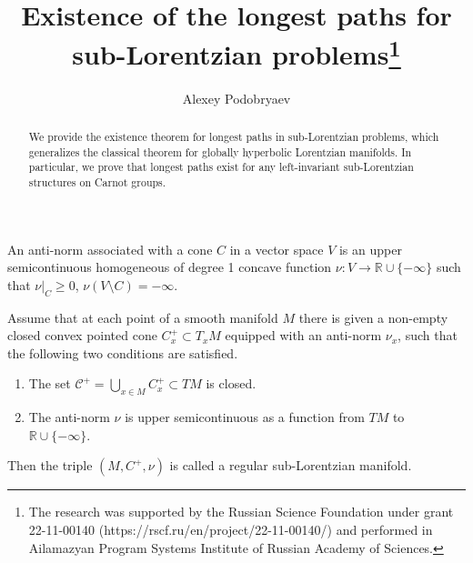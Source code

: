 \documentclass[12pt]{llncs}
\begin{document}
\fi

\title{Existence of the longest paths for sub-Lorentzian problems\thanks{The research was supported by the Russian Science Foundation under grant 22-11-00140 (https://rscf.ru/en/project/22-11-00140/) and performed in Ailamazyan Program Systems Institute of Russian Academy of Sciences.}}

\author{Alexey Podobryaev
}

\maketitle

\begin{abstract}
We provide the existence theorem for longest paths in sub-Lorentzian problems, which generalizes the classical theorem for globally hyperbolic Lorentzian manifolds. In particular, we prove that longest paths exist for any left-invariant sub-Lorentzian structures on Carnot groups.

\end{abstract}

\begin{definition}
\label{def-antinorm}
An anti-norm associated with a cone $C$ in a vector space $V$ is an upper semicontinuous homogeneous of degree 1 concave function
$\nu : V \rightarrow \mathbb{R} \cup \{-\infty\}$ such that
$\nu|_{C} \ge 0$, $\nu(V \setminus C) = -\infty$.
\end{definition}

\begin{definition}
\label{def-reg-sl}
Assume that at each point of a smooth manifold $M$ there is given a non-empty closed convex pointed cone $C^+_x \subset T_xM$ equipped with an anti-norm $\nu_x$, such that
the following two conditions are satisfied.
\begin{enumerate}
	\item[\emph{(1)}] The set $\mathcal{C}^+=\bigcup\limits_{x\in M}C^+_x\subset TM$ is closed.
    \item[\emph{(2)}] The anti-norm $\nu$ is upper semicontinuous as a function from $TM$ to $\mathbb{R}\cup\{-\infty\}$.
\end{enumerate}
Then the triple $(M, C^+, \nu)$ is called a regular sub-Lorentzian manifold.
\end{definition}
\end{document}

